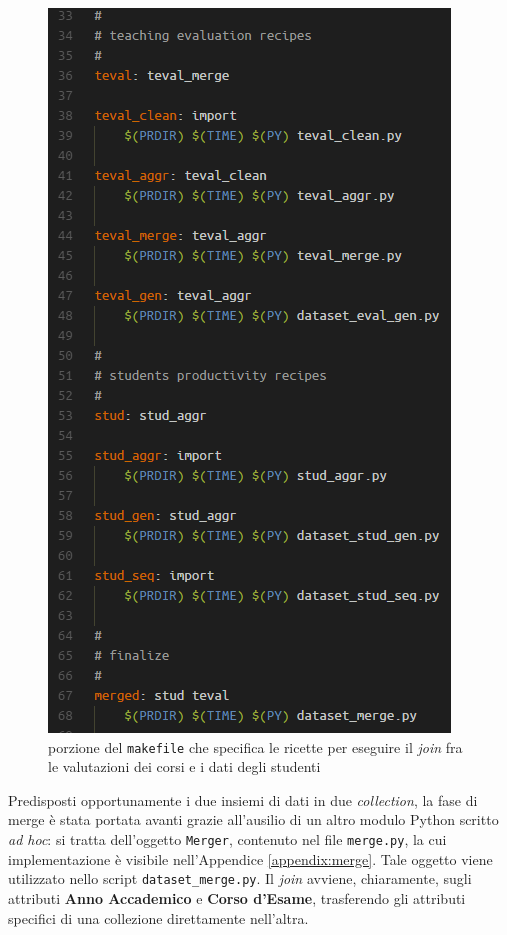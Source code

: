 		\begin{figure}
			\centering
			\caption{porzione del \texttt{makefile} che specifica le ricette per eseguire il \textit{join} fra le valutazioni dei corsi e i dati degli studenti}
			\label{make_join}
			\includegraphics[scale=0.80]{img/make_join.png}
		\end{figure} 

		Predisposti opportunamente i due insiemi di dati in due \textit{collection}, la fase di merge è stata portata avanti grazie all'ausilio di un altro modulo Python scritto \textit{ad hoc}: si tratta dell'oggetto \texttt{Merger}, contenuto nel file \texttt{merge.py}, la cui implementazione è visibile nell'Appendice \ref{appendix:merge}. Tale oggetto viene utilizzato nello script \texttt{dataset\_merge.py}. Il \textit{join} avviene, chiaramente, sugli attributi \textbf{Anno Accademico} e \textbf{Corso d'Esame}, trasferendo gli attributi specifici di una collezione direttamente nell'altra. \\

